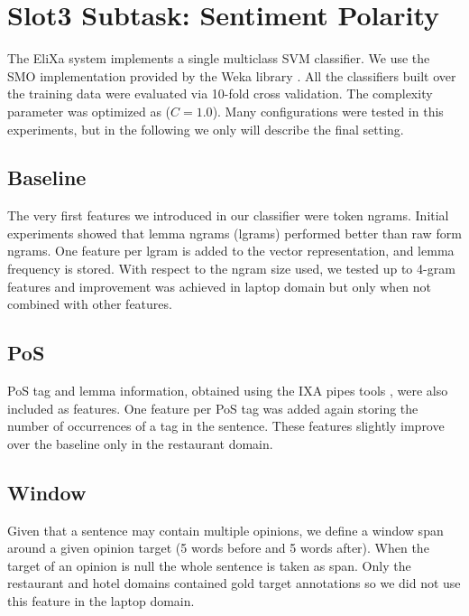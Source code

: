 \documentclass[11pt,letterpaper]{article}
\begin{document}
\section{Slot3 Subtask: Sentiment Polarity}
\label{sec:slot3}

The EliXa system implements a single multiclass SVM classifier. We use the SMO implementation provided by the Weka library \cite{hall_weka_2009}. All the classifiers built over the training data were evaluated via 10-fold cross validation. The complexity parameter was optimized as ($C=1.0$). Many configurations were tested in this experiments, but in the following we only will describe the final setting. 

\subsection{Baseline}
\label{sec:slot3_ngram}

The very first features we introduced in our classifier were token ngrams. Initial experiments showed that lemma ngrams (lgrams) performed better than raw form ngrams. One feature per lgram is added to the vector representation, and lemma frequency is stored. With respect to the ngram size used, we tested up to 4-gram features and improvement was achieved in laptop domain but only when not combined with other features.

\subsection{PoS}
\label{sec:slot3_pos}

PoS tag and lemma information, obtained using the IXA pipes tools \cite{agerri2014ixapipes}, were also included as features. One feature per PoS tag was added again storing the number of occurrences of a tag in the sentence. These features slightly improve over the baseline only in the restaurant domain.

\subsection{Window}
\label{sec:slot3_win}

Given that a sentence may contain multiple opinions, we define a  window span around a given opinion target (5 words before and 5 words after). When the target of an opinion is null the whole sentence is taken as span. Only the restaurant and hotel domains contained gold target annotations so we did not use this feature in the laptop domain. 
\end{document}
